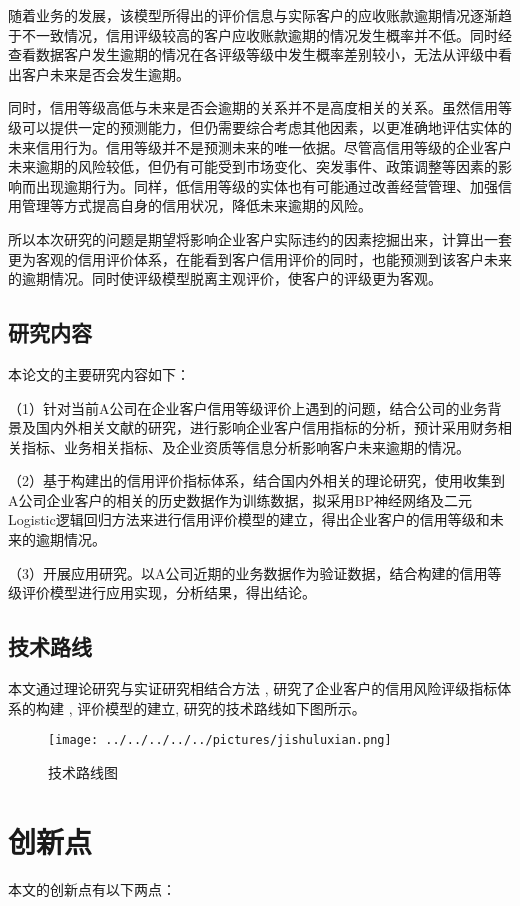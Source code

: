 随着业务的发展，该模型所得出的评价信息与实际客户的应收账款逾期情况逐渐趋于不一致情况，信用评级较高的客户应收账款逾期的情况发生概率并不低。同时经查看数据客户发生逾期的情况在各评级等级中发生概率差别较小，无法从评级中看出客户未来是否会发生逾期。

同时，信用等级高低与未来是否会逾期的关系并不是高度相关的关系。虽然信用等级可以提供一定的预测能力，但仍需要综合考虑其他因素，以更准确地评估实体的未来信用行为。信用等级并不是预测未来的唯一依据。尽管高信用等级的企业客户未来逾期的风险较低，但仍有可能受到市场变化、突发事件、政策调整等因素的影响而出现逾期行为。同样，低信用等级的实体也有可能通过改善经营管理、加强信用管理等方式提高自身的信用状况，降低未来逾期的风险。

所以本次研究的问题是期望将影响企业客户实际违约的因素挖掘出来，计算出一套更为客观的信用评价体系，在能看到客户信用评价的同时，也能预测到该客户未来的逾期情况。同时使评级模型脱离主观评价，使客户的评级更为客观。
\subsection{研究内容}
本论文的主要研究内容如下：

（1）针对当前A公司在企业客户信用等级评价上遇到的问题，结合公司的业务背景及国内外相关文献的研究，进行影响企业客户信用指标的分析，预计采用财务相关指标、业务相关指标、及企业资质等信息分析影响客户未来逾期的情况。

（2）基于构建出的信用评价指标体系，结合国内外相关的理论研究，使用收集到A公司企业客户的相关的历史数据作为训练数据，拟采用BP神经网络及二元Logistic逻辑回归方法来进行信用评价模型的建立，得出企业客户的信用等级和未来的逾期情况。

（3）开展应用研究。以A公司近期的业务数据作为验证数据，结合构建的信用等级评价模型进行应用实现，分析结果，得出结论。

\subsection{技术路线}
本文通过理论研究与实证研究相结合方法 , 研究了企业客户的信用风险评级指标体系的构建 , 评价模型的建立, 研究的技术路线如下图所示。

\begin{figure}[!h]
	\centering
	\texttt{[image: ../../../../../pictures/jishuluxian.png]}
	\caption{技术路线图}
\end{figure}

\section{创新点}
本文的创新点有以下两点：

